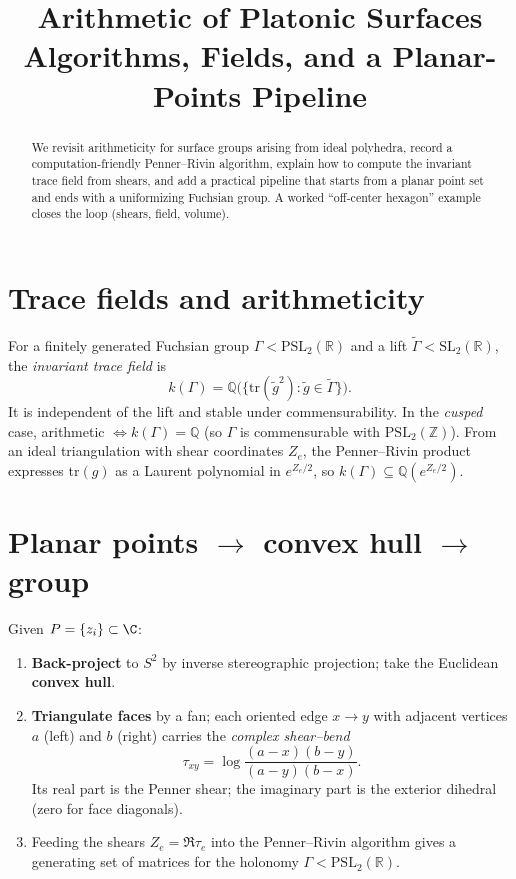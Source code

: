 \documentclass[11pt]{article}
\title{\textbf{Arithmetic of Platonic Surfaces}\\[2pt]\large Algorithms, Fields, and a Planar-Points Pipeline}
\author{}
\date{}
\theoremstyle{definition}
\theoremstyle{remark}
\newcommand{\Z}{\mathbb{Z}}
\newcommand{\Q}{\mathbb{Q}}
\newcommand{\PSL}{\mathrm{PSL}}
\newcommand{\tr}{\mathrm{tr}}
\begin{document}
\maketitle
\begin{abstract}
We revisit arithmeticity for surface groups arising from ideal polyhedra, record a computation-friendly Penner--Rivin algorithm, explain how to compute the invariant trace field from shears, and add a practical pipeline that starts from a planar point set and ends with a uniformizing Fuchsian group. A worked ``off-center hexagon'' example closes the loop (shears, field, volume).
\end{abstract}
\section{Trace fields and arithmeticity}
For a finitely generated Fuchsian group $\Gamma<\PSL_2(\mathbb{R})$ and a lift $\widetilde\Gamma<\mathrm{SL}_2(\mathbb{R})$, the \emph{invariant trace field} is
\begin{equation*}
k(\Gamma)=\Q\big(\{\tr(\tilde g^2):\tilde g\in\widetilde\Gamma\}\big).
\end{equation*}
It is independent of the lift and stable under commensurability. In the \emph{cusped} case, arithmetic $\iff k(\Gamma)=\Q$ (so $\Gamma$ is commensurable with $\PSL_2(\Z)$). From an ideal triangulation with shear coordinates $Z_e$, the Penner--Rivin product expresses $\tr(g)$ as a Laurent polynomial in $e^{Z_e/2}$, so $k(\Gamma)\subseteq \Q(e^{Z_e/2})$.
\section{Planar points $\to$ convex hull $\to$ group}
Given $P=\{z_i\}\subset\C$:
\begin{enumerate}[leftmargin=2em]
\item \textbf{Back-project} to $S^2$ by inverse stereographic projection; take the Euclidean \textbf{convex hull}.
\item \textbf{Triangulate faces} by a fan; each oriented edge $x\to y$ with adjacent vertices $a$ (left) and $b$ (right) carries the \emph{complex shear--bend}
\begin{equation*}
\tau_{xy}=\log\!\frac{(a-x)(b-y)}{(a-y)(b-x)}.
\end{equation*}
Its real part is the Penner shear; the imaginary part is the exterior dihedral (zero for face diagonals).
\item Feeding the shears $Z_e=\Re\tau_e$ into the Penner--Rivin algorithm gives a generating set of matrices for the holonomy $\Gamma<\PSL_2(\mathbb{R})$.
\end{enumerate}
\end{document}
